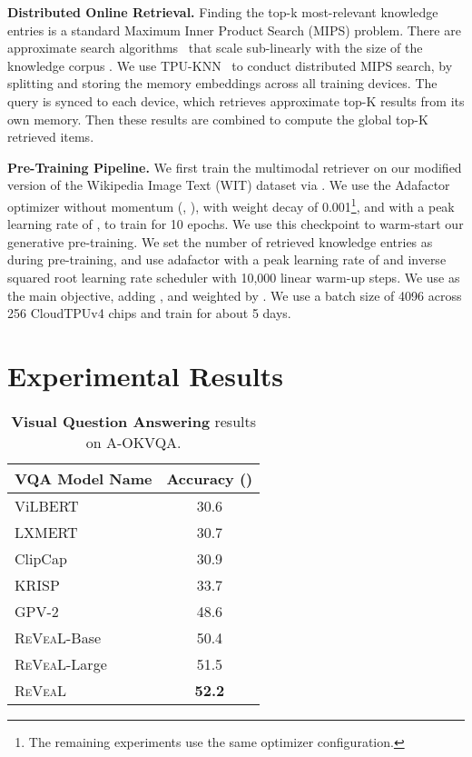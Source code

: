 \documentclass[10pt,twocolumn,letterpaper]{article}
\newcommand{\method}{R\textsc{e}V\textsc{ea}L\xspace}
\begin{document}
\textbf{Distributed Online Retrieval.}
Finding the top-k most-relevant knowledge entries is a standard Maximum Inner Product Search (MIPS) problem. There are approximate search algorithms~\cite{DBLP:conf/nips/Shrivastava014, DBLP:journals/corr/abs-2206-14286} that scale sub-linearly with the size of the knowledge corpus . We use TPU-KNN~\cite{DBLP:journals/corr/abs-2206-14286} to conduct distributed MIPS search, by splitting and storing the memory embeddings across all training devices. The query is synced to each device, which retrieves approximate top-K results from its own memory. Then these results are combined to compute the global top-K retrieved items. 


\textbf{Pre-Training Pipeline.}
We first train the multimodal retriever on our modified version of the Wikipedia Image Text (WIT) dataset via . We use the Adafactor optimizer without momentum (, ), with weight decay of 0.001\footnote{The remaining experiments use the same optimizer configuration.}, and with a peak learning rate of , to train for 10 epochs. We use this checkpoint to warm-start our generative pre-training.
 We set the number of retrieved knowledge entries as  during pre-training, and use adafactor with a peak learning rate of  and inverse squared root learning rate scheduler with 10,000 linear warm-up steps. We use  as the main objective, adding ,  and  weighted by . We use a batch size of 4096 across 256 CloudTPUv4 chips and train for about 5 days.



 \section{Experimental Results}\label{sec:experiment}



\begin{table}[t!]
\centering
\small
\begin{tabular}{l|c} \toprule
\textbf{VQA Model Name} & \textbf{Accuracy ()}\\ \midrule
ViLBERT~\cite{DBLP:conf/nips/LuBPL19}  & 30.6 \\
LXMERT~\cite{DBLP:conf/emnlp/TanB19} & 30.7 \\
ClipCap~\cite{DBLP:journals/corr/abs-2111-09734} & 30.9 \\
KRISP~\cite{DBLP:conf/cvpr/MarinoCP0R21} & 33.7 \\ 
GPV-2~\cite{DBLP:conf/eccv/KamathCGKHK22} & 48.6 \\ \midrule
\method-Base & 50.4  \\
\method-Large& 51.5  \\
\method & \textbf{52.2}  \\\bottomrule
\end{tabular}
    \vspace{-.1in}
\caption{\textbf{Visual Question Answering} results on A-OKVQA.}
\label{tab:aokvqa}
\end{table}
\end{document}
